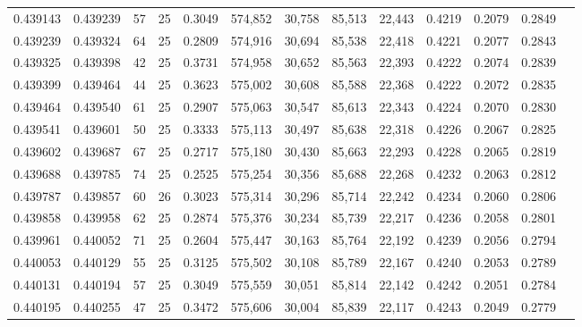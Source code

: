 \begin{tabular}{rrrrrrrrrrrrr}
0.439143 & 0.439239 &    57 &  25 &                                     0.3049 & 574,852 &  30,758 &  85,513 &  22,443 & 0.4219 & 0.2079 & 0.2849 \\
0.439239 & 0.439324 &    64 &  25 &                                     0.2809 & 574,916 &  30,694 &  85,538 &  22,418 & 0.4221 & 0.2077 & 0.2843 \\
0.439325 & 0.439398 &    42 &  25 &                                     0.3731 & 574,958 &  30,652 &  85,563 &  22,393 & 0.4222 & 0.2074 & 0.2839 \\
0.439399 & 0.439464 &    44 &  25 &                                     0.3623 & 575,002 &  30,608 &  85,588 &  22,368 & 0.4222 & 0.2072 & 0.2835 \\
0.439464 & 0.439540 &    61 &  25 &                                     0.2907 & 575,063 &  30,547 &  85,613 &  22,343 & 0.4224 & 0.2070 & 0.2830 \\
0.439541 & 0.439601 &    50 &  25 &                                     0.3333 & 575,113 &  30,497 &  85,638 &  22,318 & 0.4226 & 0.2067 & 0.2825 \\
0.439602 & 0.439687 &    67 &  25 &                                     0.2717 & 575,180 &  30,430 &  85,663 &  22,293 & 0.4228 & 0.2065 & 0.2819 \\
0.439688 & 0.439785 &    74 &  25 &                                     0.2525 & 575,254 &  30,356 &  85,688 &  22,268 & 0.4232 & 0.2063 & 0.2812 \\
0.439787 & 0.439857 &    60 &  26 &                                     0.3023 & 575,314 &  30,296 &  85,714 &  22,242 & 0.4234 & 0.2060 & 0.2806 \\
0.439858 & 0.439958 &    62 &  25 &                                     0.2874 & 575,376 &  30,234 &  85,739 &  22,217 & 0.4236 & 0.2058 & 0.2801 \\
0.439961 & 0.440052 &    71 &  25 &                                     0.2604 & 575,447 &  30,163 &  85,764 &  22,192 & 0.4239 & 0.2056 & 0.2794 \\
0.440053 & 0.440129 &    55 &  25 &                                     0.3125 & 575,502 &  30,108 &  85,789 &  22,167 & 0.4240 & 0.2053 & 0.2789 \\
0.440131 & 0.440194 &    57 &  25 &                                     0.3049 & 575,559 &  30,051 &  85,814 &  22,142 & 0.4242 & 0.2051 & 0.2784 \\
0.440195 & 0.440255 &    47 &  25 &                                     0.3472 & 575,606 &  30,004 &  85,839 &  22,117 & 0.4243 & 0.2049 & 0.2779 \\

\end{tabular}
